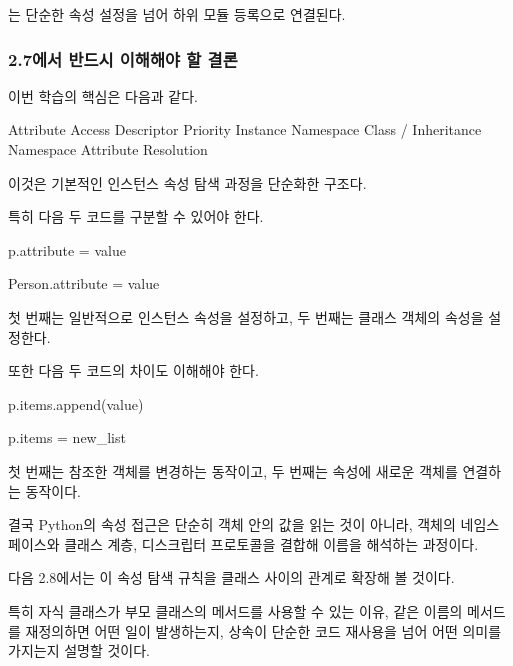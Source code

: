 는 단순한 속성 설정을 넘어 하위 모듈 등록으로 연결된다.

\subsubsection{2.7에서 반드시 이해해야 할 결론}

이번 학습의 핵심은 다음과 같다.

\begin{dhksmry}[centered]
Attribute Access
\da
Descriptor Priority
\da
Instance Namespace
\da
Class / Inheritance Namespace
\da
Attribute Resolution
\end{dhksmry}

이것은 기본적인 인스턴스 속성 탐색 과정을 단순화한 구조다.

특히 다음 두 코드를 구분할 수 있어야 한다.

\begin{dhkcode}
p.attribute = value

Person.attribute = value
\end{dhkcode}

첫 번째는 일반적으로 인스턴스 속성을 설정하고, 두 번째는 클래스 객체의 속성을 설정한다.

또한 다음 두 코드의 차이도 이해해야 한다.

\begin{dhkcode}
p.items.append(value)

p.items = new_list
\end{dhkcode}

첫 번째는 참조한 객체를 변경하는 동작이고, 두 번째는 속성에 새로운 객체를 연결하는 동작이다.

결국 Python의 속성 접근은 단순히 객체 안의 값을 읽는 것이 아니라, 객체의 네임스페이스와 클래스 계층, 디스크립터 프로토콜을 결합해 이름을 해석하는 과정이다.

다음 2.8에서는 이 속성 탐색 규칙을 클래스 사이의 관계로 확장해 볼 것이다.

특히 자식 클래스가 부모 클래스의 메서드를 사용할 수 있는 이유, 같은 이름의 메서드를 재정의하면 어떤 일이 발생하는지, 상속이 단순한 코드 재사용을 넘어 어떤 의미를 가지는지 설명할 것이다.
